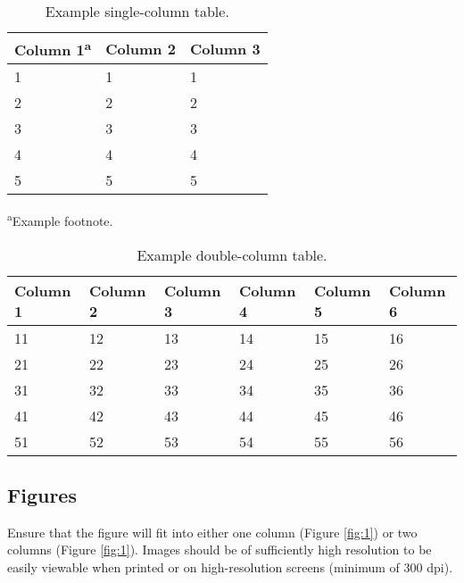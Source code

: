 \documentclass[twocolumn]{sintr}
\begin{document}
\begin{table}[b]
  	\centering\footnotesize\sffamily
  	\caption{Example single-column table.}
  	\begin{tableminipage}{\linewidth}
    	\begin{tabularx} {\linewidth}{XXX}
			\toprule
            Column 1\textsuperscript{a} & Column 2 & Column 3  \\            
	    	\midrule
             1 &  1 &  1 \\
             2 &  2 &  2 \\
             3 &  3 &  3 \\
             4 &  4 &  4 \\
             5 &  5 &  5 \\
            \bottomrule
    	\end{tabularx}
        \label{tab:1}
        \vskip0pt
        \textsuperscript{a}Example footnote.
  	\end{tableminipage}
\end{table}

\begin{table*}[t]
  	\centering\footnotesize\sffamily
  	\caption{Example double-column table.}
  	\begin{tableminipage}{\linewidth}
    	\begin{tabularx} {\linewidth}{XXXXXX}
			\toprule
            Column 1 & Column 2 & Column 3 & Column 4 & Column 5 & Column 6 \\            
	    	\midrule
             11 &  12 &  13 &  14 &  15 &  16 \\
             21 &  22 &  23 &  24 &  25 &  26 \\
             31 &  32 &  33 &  34 &  35 &  36 \\
             41 &  42 &  43 &  44 &  45 &  46 \\
             51 &  52 &  53 &  54 &  55 &  56 \\
            \bottomrule
    	\end{tabularx}
        \label{tab:2}
  	\end{tableminipage}
\end{table*}

\subsection{Figures}

Ensure that the figure will fit into either one column (Figure \ref{fig:1}) or two columns (Figure \ref{fig:1}). Images should be of sufficiently high resolution to be easily viewable when printed or on high-resolution screens (minimum of 300 dpi).
\end{document}
